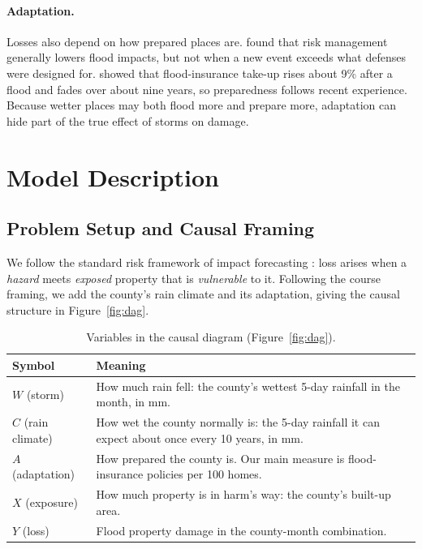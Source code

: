 \documentclass[10pt,twocolumn]{article}
\begin{document}
\paragraph{Adaptation.}
Losses also depend on how prepared places are. \citet{kreibich2022} found that risk management generally lowers flood impacts, but not when a new event exceeds what defenses were designed for. \citet{gallagher2013} showed that flood-insurance take-up rises about 9\% after a flood and fades over about nine years, so preparedness follows recent experience. Because wetter places may both flood more and prepare more, adaptation can hide part of the true effect of storms on damage.

\section{Model Description}
\subsection{Problem Setup and Causal Framing}

We follow the standard risk framework of impact forecasting \citep{merz2020}: loss arises when a
\emph{hazard} meets \emph{exposed} property that is \emph{vulnerable} to it. Following the course
framing, we add the county's rain climate and its adaptation, giving the causal structure in
Figure~\ref{fig:dag}.

\begin{table}[H]
\centering
\small
\renewcommand{\arraystretch}{1.2}
\begin{tabularx}{\linewidth}{@{}lL@{}}
\toprule
Symbol & Meaning \\
\midrule
$W$ (storm)        & How much rain fell: the county's wettest 5-day rainfall in the month, in mm. \\
$C$ (rain climate) & How wet the county normally is: the 5-day rainfall it can expect about once every 10 years, in mm. \\
$A$ (adaptation)   & How prepared the county is. Our main measure is flood-insurance policies per 100 homes. \\
$X$ (exposure)     & How much property is in harm's way: the county's built-up area. \\
$Y$ (loss)         & Flood property damage in the county-month combination. \\
\bottomrule
\end{tabularx}
\caption{Variables in the causal diagram (Figure~\ref{fig:dag}).}
\label{tab:dag-vars}
\end{table}
\end{document}

